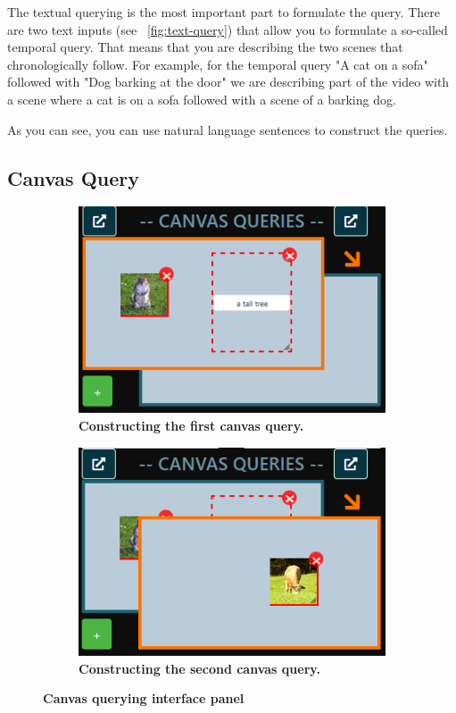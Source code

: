 The textual querying is the most important part to formulate the query. There are two text inputs (see ~\cref{fig:text-query}) that allow you to formulate a so-called temporal query. That means that you are describing the two scenes that chronologically follow. For example, for the temporal query "A cat on a sofa" followed with "Dog barking at the door" we are describing part of the video with a scene where a cat is on a sofa followed with a scene of a barking dog.

As you can see, you can use natural language sentences to construct the queries. 


\subsection{Canvas Query}
\begin{figure}[h]
	\centering
  \begin{subfigure}[b]{0.45\textwidth}
      \centering
      \includegraphics[width=\textwidth]{img/canvas-1.png}
      \caption{\textbf{Constructing the first canvas query.}}
  \end{subfigure}
  \hfill
  \begin{subfigure}[b]{0.45\textwidth}
      \centering
      \includegraphics[width=\textwidth]{img/canvas-2.png}
      \caption{\textbf{Constructing the second canvas query.}}
  \end{subfigure}
	
  \caption{\textbf{Canvas querying interface panel}}
	\label{fig:canvas-query}
\end{figure}

